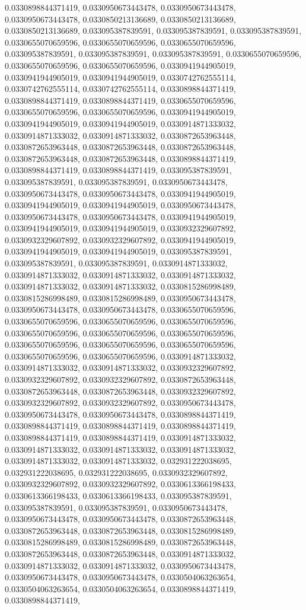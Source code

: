 \documentclass[
  ,man]{apa6}
\begin{document}
0.0330898844371419, 0.0330950673443478, 0.0330950673443478, 0.0330950673443478, 0.0330850213136689, 0.0330850213136689, 0.0330850213136689, 0.033095387839591, 0.033095387839591, 0.033095387839591, 0.0330655070659596, 0.0330655070659596, 0.0330655070659596, 0.033095387839591, 0.033095387839591, 0.033095387839591, 0.0330655070659596, 0.0330655070659596, 0.0330655070659596, 0.0330941944905019, 0.0330941944905019, 0.0330941944905019, 0.0330742762555114, 0.0330742762555114, 0.0330742762555114, 0.0330898844371419,
0.0330898844371419, 0.0330898844371419, 0.0330655070659596, 0.0330655070659596, 0.0330655070659596, 0.0330941944905019, 0.0330941944905019, 0.0330941944905019, 0.0330914871333032, 0.0330914871333032, 0.0330914871333032, 0.0330872653963448, 0.0330872653963448, 0.0330872653963448, 0.0330872653963448, 0.0330872653963448, 0.0330872653963448, 0.0330898844371419, 0.0330898844371419, 0.0330898844371419, 0.033095387839591, 0.033095387839591, 0.033095387839591, 0.0330950673443478, 0.0330950673443478, 0.0330950673443478,
0.0330941944905019, 0.0330941944905019, 0.0330941944905019, 0.0330950673443478, 0.0330950673443478, 0.0330950673443478, 0.0330941944905019, 0.0330941944905019, 0.0330941944905019, 0.0330932329607892, 0.0330932329607892, 0.0330932329607892, 0.0330941944905019, 0.0330941944905019, 0.0330941944905019, 0.033095387839591, 0.033095387839591, 0.033095387839591, 0.0330914871333032, 0.0330914871333032, 0.0330914871333032, 0.0330914871333032, 0.0330914871333032, 0.0330914871333032, 0.0330815286998489, 0.0330815286998489,
0.0330815286998489, 0.0330950673443478, 0.0330950673443478, 0.0330950673443478, 0.0330655070659596, 0.0330655070659596, 0.0330655070659596, 0.0330655070659596, 0.0330655070659596, 0.0330655070659596, 0.0330655070659596, 0.0330655070659596, 0.0330655070659596, 0.0330655070659596, 0.0330655070659596, 0.0330655070659596, 0.0330914871333032, 0.0330914871333032, 0.0330914871333032, 0.0330932329607892, 0.0330932329607892, 0.0330932329607892, 0.0330872653963448, 0.0330872653963448, 0.0330872653963448, 0.0330932329607892,
0.0330932329607892, 0.0330932329607892, 0.0330950673443478, 0.0330950673443478, 0.0330950673443478, 0.0330898844371419, 0.0330898844371419, 0.0330898844371419, 0.0330898844371419, 0.0330898844371419, 0.0330898844371419, 0.0330914871333032, 0.0330914871333032, 0.0330914871333032, 0.0330914871333032, 0.0330914871333032, 0.0330914871333032, 0.032931222038695, 0.032931222038695, 0.032931222038695, 0.0330932329607892, 0.0330932329607892, 0.0330932329607892, 0.0330613366198433, 0.0330613366198433, 0.0330613366198433,
0.033095387839591, 0.033095387839591, 0.033095387839591, 0.0330950673443478, 0.0330950673443478, 0.0330950673443478, 0.0330872653963448, 0.0330872653963448, 0.0330872653963448, 0.0330815286998489, 0.0330815286998489, 0.0330815286998489, 0.0330872653963448, 0.0330872653963448, 0.0330872653963448, 0.0330914871333032, 0.0330914871333032, 0.0330914871333032, 0.0330950673443478, 0.0330950673443478, 0.0330950673443478, 0.0330504063263654, 0.0330504063263654, 0.0330504063263654, 0.0330898844371419, 0.0330898844371419,
\end{document}
